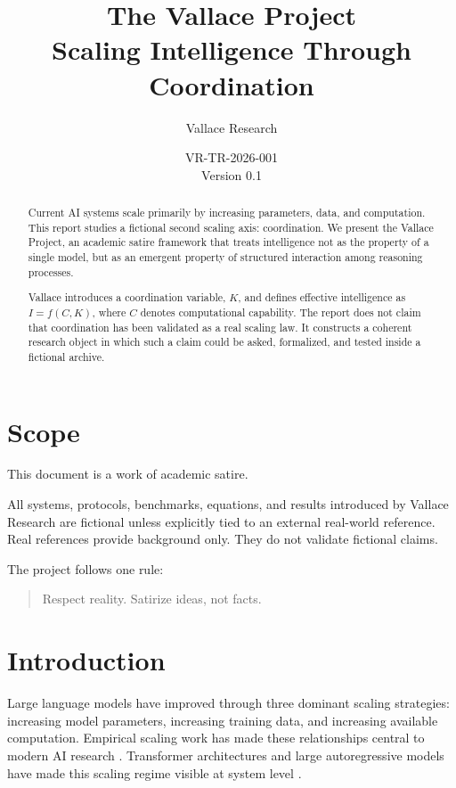 \documentclass[11pt]{article}
\title{The Vallace Project\\\large Scaling Intelligence Through Coordination}
\author{Vallace Research}
\date{VR-TR-2026-001\\Version 0.1}
\begin{document}
\maketitle

\begin{abstract}
Current AI systems scale primarily by increasing parameters, data, and
computation. This report studies a fictional second scaling axis: coordination.
We present the Vallace Project, an academic satire framework that treats
intelligence not as the property of a single model, but as an emergent property
of structured interaction among reasoning processes.

Vallace introduces a coordination variable, $K$, and defines effective
intelligence as $I = f(C, K)$, where $C$ denotes computational capability. The
report does not claim that coordination has been validated as a real scaling
law. It constructs a coherent research object in which such a claim could be
asked, formalized, and tested inside a fictional archive.
\end{abstract}

\section{Scope}

This document is a work of academic satire.

All systems, protocols, benchmarks, equations, and results introduced by
Vallace Research are fictional unless explicitly tied to an external real-world
reference. Real references provide background only. They do not validate
fictional claims.

The project follows one rule:

\begin{quote}
Respect reality. Satirize ideas, not facts.
\end{quote}

\section{Introduction}

Large language models have improved through three dominant scaling strategies:
increasing model parameters, increasing training data, and increasing available
computation. Empirical scaling work has made these relationships central to
modern AI research \cite{kaplan2020scaling,hoffmann2022training}. Transformer
architectures and large autoregressive models have made this scaling regime
visible at system level \cite{vaswani2017attention,brown2020language}.
\end{document}
